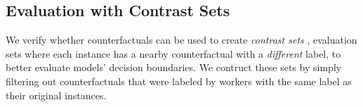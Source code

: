 





\TableContrastSet


\subsection{Evaluation with Contrast Sets}
\label{subsec:contrast_set}

\TableAugSST
\TableAugNLI
We verify whether \sysname counterfactuals can be used to create \emph{contrast sets} \cite{gardner2020contrast}, \ie evaluation sets where each instance has a nearby counterfactual with a \emph{different} label, to better evaluate models' decision boundaries.
We contruct these sets by simply filtering out counterfactuals that were labeled by workers with the same label as their original instances.

